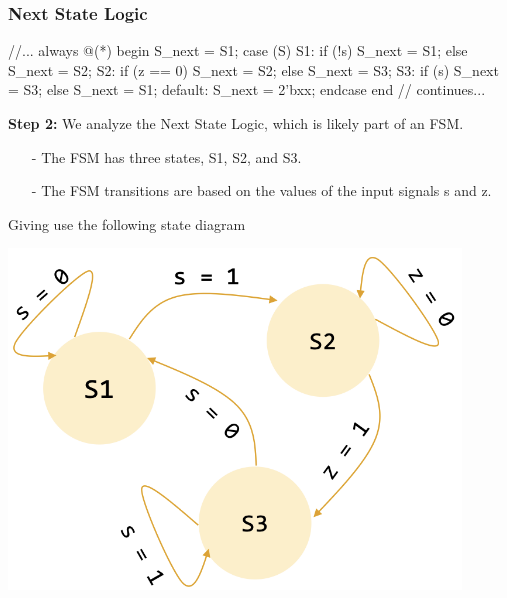 \documentclass[12pt,openany]{book}
\begin{document}
\subsubsection{Next State Logic}
\begin{minipage}[htp]{0.45\textwidth}
	
\begin{vhdl}
//...
always @(*) begin
	S_next = S1;
	case (S)
		S1: if (!s) S_next = S1;
		else S_next = S2;
		S2: if (z == 0) S_next = S2;
		else S_next = S3;
		S3: if (s) S_next = S3;
		else S_next = S1;
		default: S_next = 2'bxx;
	endcase
end
// continues...
\end{vhdl}
\end{minipage}
\hfill
\vline
\hfill
\begin{minipage}[htp]{0.45\textwidth}
\begin{justify}
\textbf{Step 2:} We analyze the Next State Logic, which is likely part of an FSM.
\begin{itemize}
	\item[-] The FSM has three states, S1, S2, and S3.
	\item[-] The FSM transitions are based on the values of the input signals s and z.
\end{itemize}
Giving use the following state diagram
\begin{center}
	\includegraphics[width=0.9\textwidth]{circuits/18.4.png}
\end{center}
\end{justify}
\end{minipage}
\end{document}
